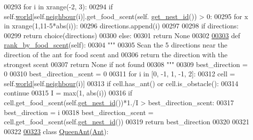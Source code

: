 \begin{DoxyCode}
00293             \textcolor{keywordflow}{for} i \textcolor{keywordflow}{in} xrange(-2, 3):
00294                 \textcolor{keywordflow}{if} self.\hyperlink{classants_1_1Ant_a55f64c7cafb3806bdcfda42586adbff5}{world}[self.\hyperlink{classants_1_1Ant_a2ddd97dadaa5d24c459b0117dc6e1190}{neighbour}(i)].get\_food\_scent(self.
      \hyperlink{classants_1_1Ant_a10dc42722864d5850912dd34242d5cf8}{get\_nest\_id}()) > 0:
00295                     \textcolor{keywordflow}{for} x \textcolor{keywordflow}{in} xrange(1,11-5*abs(i)):
00296                         directions.append(i) 
00297 
00298         \textcolor{keywordflow}{if} directions:
00299             \textcolor{keywordflow}{return} choice(directions)
00300         \textcolor{keywordflow}{else}:
00301             \textcolor{keywordflow}{return} \textcolor{keywordtype}{None}
00302 
\hypertarget{ants_8py_source_l00303}{}\hyperlink{classants_1_1WorkerAnt_a65ef16439f2ff5d217e1e443d57b65d1}{00303}     \textcolor{keyword}{def }\hyperlink{classants_1_1WorkerAnt_a65ef16439f2ff5d217e1e443d57b65d1}{rank\_by\_food\_scent}(self):
00304         \textcolor{stringliteral}{"""}
00305 \textcolor{stringliteral}{        Scan the 5 directions near the direction of the ant for food scent and}
00306 \textcolor{stringliteral}{        return the direction with the strongest scent}
00307 \textcolor{stringliteral}{        return None if not found}
00308 \textcolor{stringliteral}{        """}
00309         best\_direction = 0
00310         best\_direction\_scent = 0
00311         \textcolor{keywordflow}{for} i \textcolor{keywordflow}{in} [0, -1, 1, -1, 2]:
00312             cell = self.\hyperlink{classants_1_1Ant_a55f64c7cafb3806bdcfda42586adbff5}{world}[self.\hyperlink{classants_1_1Ant_a2ddd97dadaa5d24c459b0117dc6e1190}{neighbour}(i)]
00313             \textcolor{keywordflow}{if} cell.has\_ant() \textcolor{keywordflow}{or} cell.is\_obstacle():
00314                 \textcolor{keywordflow}{continue}
00315             I = max(1, abs(i))
00316             \textcolor{keywordflow}{if} cell.get\_food\_scent(self.\hyperlink{classants_1_1Ant_a10dc42722864d5850912dd34242d5cf8}{get\_nest\_id}())*1./I > best\_direction\_scent:
00317                 best\_direction = i
00318                 best\_direction\_scent = cell.get\_food\_scent(self.\hyperlink{classants_1_1Ant_a10dc42722864d5850912dd34242d5cf8}{get\_nest\_id}())
00319         \textcolor{keywordflow}{return} best\_direction
00320 
00321 
00322 
\hypertarget{ants_8py_source_l00323}{}\hyperlink{classants_1_1QueenAnt}{00323} \textcolor{keyword}{class }\hyperlink{classants_1_1QueenAnt}{QueenAnt}(\hyperlink{classants_1_1Ant}{Ant}):

\end{DoxyCode}
